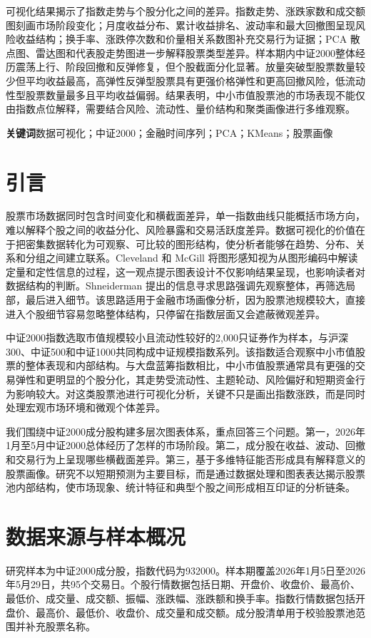 \documentclass[UTF8,zihao=-4,fontset=windows]{ctexart}
\begin{document}
可视化结果揭示了指数走势与个股分化之间的差异。指数走势、涨跌家数和成交额图刻画市场阶段变化；月度收益分布、累计收益排名、波动率和最大回撤图呈现风险收益结构；换手率、涨跌停次数和价量相关系数图补充交易行为证据；PCA 散点图、雷达图和代表股走势图进一步解释股票类型差异。样本期内中证2000整体经历震荡上行、阶段回撤和反弹修复，但个股截面分化显著。放量突破型股票数量较少但平均收益最高，高弹性反弹型股票具有更强价格弹性和更高回撤风险，低流动性型股票数量最多且平均收益偏弱。结果表明，中小市值股票池的市场表现不能仅由指数点位解释，需要结合风险、流动性、量价结构和聚类画像进行多维观察。

\noindent\textbf{关键词}\quad 数据可视化；中证2000；金融时间序列；PCA；KMeans；股票画像

\section{引言}
股票市场数据同时包含时间变化和横截面差异，单一指数曲线只能概括市场方向，难以解释个股之间的收益分化、风险暴露和交易活跃度差异。数据可视化的价值在于把密集数据转化为可观察、可比较的图形结构，使分析者能够在趋势、分布、关系和分组之间建立联系。Cleveland 和 McGill 将图形感知视为从图形编码中解读定量和定性信息的过程，这一观点提示图表设计不仅影响结果呈现，也影响读者对数据结构的判断。Shneiderman 提出的信息寻求思路强调先观察整体，再筛选局部，最后进入细节。该思路适用于金融市场画像分析，因为股票池规模较大，直接进入个股细节容易忽略整体结构，只停留在指数层面又会遮蔽微观差异。

中证2000指数选取市值规模较小且流动性较好的2,000只证券作为样本，与沪深300、中证500和中证1000共同构成中证规模指数系列。该指数适合观察中小市值股票的整体表现和内部结构。与大盘蓝筹指数相比，中小市值股票通常具有更强的交易弹性和更明显的个股分化，其走势受流动性、主题轮动、风险偏好和短期资金行为影响较大。对这类股票池进行可视化分析，关键不只是画出指数涨跌，而是同时处理宏观市场环境和微观个体差异。

我们围绕中证2000成分股构建多层次图表体系，重点回答三个问题。第一，2026年1月至5月中证2000总体经历了怎样的市场阶段。第二，成分股在收益、波动、回撤和交易行为上呈现哪些横截面差异。第三，基于多维特征能否形成具有解释意义的股票画像。研究不以短期预测为主要目标，而是通过数据处理和图表表达揭示股票池内部结构，使市场现象、统计特征和典型个股之间形成相互印证的分析链条。

\section{数据来源与样本概况}
研究样本为中证2000成分股，指数代码为932000。样本期覆盖2026年1月5日至2026年5月29日，共95个交易日。个股行情数据包括日期、开盘价、收盘价、最高价、最低价、成交量、成交额、振幅、涨跌幅、涨跌额和换手率。指数行情数据包括开盘价、最高价、最低价、收盘价、成交量和成交额。成分股清单用于校验股票池范围并补充股票名称。
\end{document}
